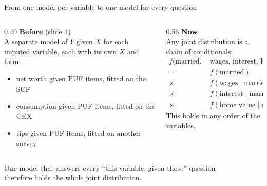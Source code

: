 \documentclass[11pt,aspectratio=169]{beamer}
\begin{document}
\begin{frame}{From one model per variable to one model for every question}
  \begin{columns}[T]
    \begin{column}{0.40\textwidth}
      \textbf{\color{yaleblue}Before} (slide 4)\\[0.5em]
      \small A separate model of $Y$ given $X$ for each imputed variable, each with its own $X$ and form:
      \begin{itemize}
        \item net worth given PUF items, fitted on the SCF
        \item consumption given PUF items, fitted on the CEX
        \item tips given PUF items, fitted on another survey
      \end{itemize}
    \end{column}
    \begin{column}{0.56\textwidth}
      \textbf{\color{yaleblue}Now}\\[0.5em]
      \small Any joint distribution is a chain of conditionals:
      \[
      \begin{aligned}
        f(\text{married},\, &\text{wages},\, \text{interest},\, \text{home value}) \\
        = \; & f(\text{married}) \\
        \times\; & f(\text{wages} \mid \text{married}) \\
        \times\; & f(\text{interest} \mid \text{married, wages}) \\
        \times\; & f(\text{home value} \mid \text{married, wages, interest})
      \end{aligned}
      \]
      This holds in any order of the variables.
    \end{column}
  \end{columns}
  \vspace{0.6em}
  \begin{center}
    \colorbox{yalelight!25}{\parbox{0.9\textwidth}{\centering
      One model that answers every ``this variable, given those'' question\\
      therefore holds the whole joint distribution.}}
  \end{center}
\end{frame}
\end{document}
